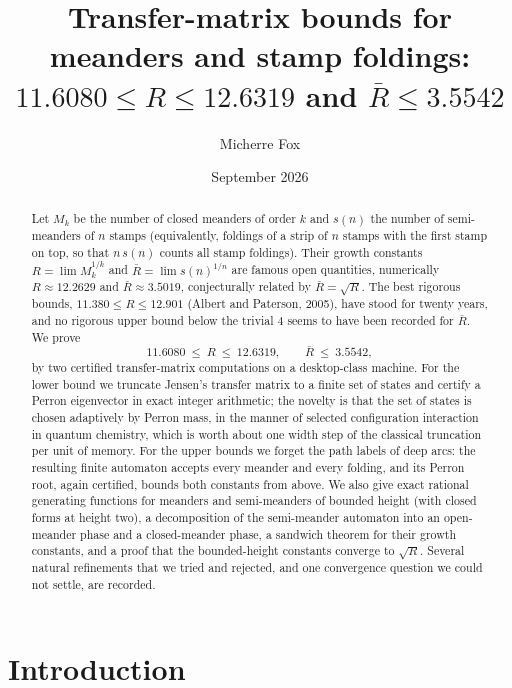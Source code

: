 \documentclass[11pt]{amsart}
\title[Transfer-matrix bounds for meanders]{Transfer-matrix bounds for meanders and stamp foldings:\\ $11.6080\le R\le 12.6319$ and $\bar R\le 3.5542$}
\author{Micherre Fox}
\date{September 2026}
\theoremstyle{definition}
\newcommand{\Rb}{\bar R}
\begin{document}
\begin{abstract}
Let $M_k$ be the number of closed meanders of order $k$ and $s(n)$ the number of semi-meanders of $n$ stamps (equivalently, foldings of a strip of $n$ stamps with the first stamp on top, so that $n\,s(n)$ counts all stamp foldings). Their growth constants $R=\lim M_k^{1/k}$ and $\Rb=\lim s(n)^{1/n}$ are famous open quantities, numerically $R\approx12.2629$ and $\Rb\approx3.5019$, conjecturally related by $\Rb=\sqrt R$. The best rigorous bounds, $11.380\le R\le12.901$ (Albert and Paterson, 2005), have stood for twenty years, and no rigorous upper bound below the trivial $4$ seems to have been recorded for $\Rb$. We prove
\[
11.6080\ \le\ R\ \le\ 12.6319,\qquad \Rb\ \le\ 3.5542,
\]
by two certified transfer-matrix computations on a desktop-class machine. For the lower bound we truncate Jensen's transfer matrix to a finite set of states and certify a Perron eigenvector in exact integer arithmetic; the novelty is that the set of states is chosen adaptively by Perron mass, in the manner of selected configuration interaction in quantum chemistry, which is worth about one width step of the classical truncation per unit of memory. For the upper bounds we forget the path labels of deep arcs: the resulting finite automaton accepts every meander and every folding, and its Perron root, again certified, bounds both constants from above. We also give exact rational generating functions for meanders and semi-meanders of bounded height (with closed forms at height two), a decomposition of the semi-meander automaton into an open-meander phase and a closed-meander phase, a sandwich theorem for their growth constants, and a proof that the bounded-height constants converge to $\sqrt R$. Several natural refinements that we tried and rejected, and one convergence question we could not settle, are recorded.
\end{abstract}

\maketitle

\section{Introduction}
\end{document}
